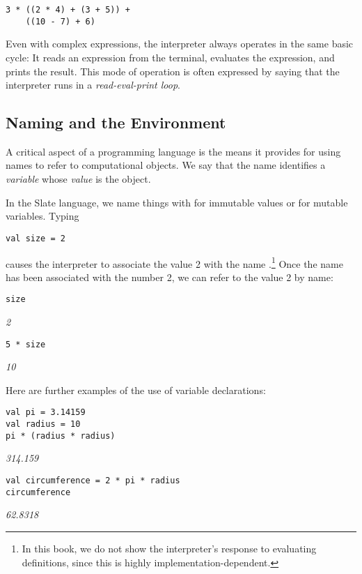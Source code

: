 \begin{lstlisting}
3 * ((2 * 4) + (3 + 5)) + 
    ((10 - 7) + 6)
\end{lstlisting}

Even with complex expressions, the interpreter always operates in the same basic cycle: It reads an expression from the terminal, evaluates the expression, and prints the result. This mode of operation is often expressed by saying that the interpreter runs in a \textit{read-eval-print loop}.

\subsection{Naming and the Environment}

A critical aspect of a programming language is the means it provides for using names to refer to computational objects. We say that the name identifies a \textit{variable} whose \textit{value} is the object.

In the Slate language, we name things with  for immutable values or  for mutable variables. Typing

\begin{lstlisting}
val size = 2
\end{lstlisting}

causes the interpreter to associate the value 2 with the name .\footnote{In this book, we do not show the interpreter's response to evaluating definitions, since this is highly implementation-dependent.} Once the name  has been associated with the number 2, we can refer to the value 2 by name:

\begin{lstlisting}
size
\end{lstlisting}
\textit{2}

\begin{lstlisting}
5 * size
\end{lstlisting}
\textit{10}

Here are further examples of the use of variable declarations:

\begin{lstlisting}
val pi = 3.14159
val radius = 10
pi * (radius * radius)
\end{lstlisting}
\textit{314.159}

\begin{lstlisting}
val circumference = 2 * pi * radius
circumference
\end{lstlisting}
\textit{62.8318}

